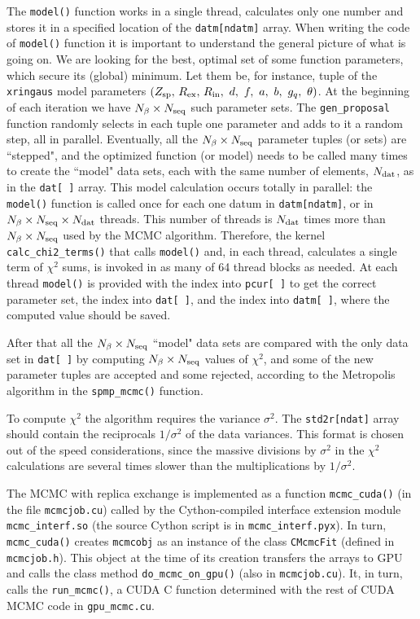 \documentclass[preprint2]{aastex}
\newcommand{\rex}{\, R_\mathrm{ex}}
\newcommand{\rin}{\, R_\mathrm{in}}
\begin{document}
The \verb|model()| function works in a single thread, calculates only one 
number and stores it in a specified location of the \verb|datm[ndatm]| array. 
When writing the code of \verb|model()| function it is important to understand
the general picture of what is going on. We are looking 
for the best, optimal set of some function parameters, which secure its (global)
minimum. Let them be, for instance, tuple of the \verb|xringaus| model parameters
$(Z_{\rm sp}, \rex, \rin, \ d, \ f, \ a, \ b, \ g_q, \ \theta)$.   
At the beginning of each iteration we have $N_\beta \times N_{\rm seq}$ such 
parameter sets. The \verb|gen_proposal| function randomly selects in each tuple
one parameter and adds to it a random step, all in parallel. Eventually, all 
the $N_\beta \times N_{\rm seq}$ parameter tuples (or sets) are ``stepped", and 
the optimized function (or model) needs to be called many times to create the
``model" data sets, each with the same number of elements, $N_{\rm dat}$, as 
in the \verb|dat[ ]| array. This model calculation occurs totally in parallel:
the \verb|model()| function is called once for each one datum in \verb|datm[ndatm]|,
or in $N_\beta \times N_{\rm seq} \times N_{\rm dat}$ threads. This number of
threads is $N_{\rm dat}$ times more than $N_\beta \times N_{\rm seq} $ used by 
the MCMC algorithm. Therefore, the kernel \verb|calc_chi2_terms()| that calls 
\verb|model()| and, in each thread, calculates a single term of $\chi^2$ sums,
is invoked in as many of 64 thread blocks as needed. At each thread
\verb|model()| is provided with the index into \verb|pcur[ ]| to get the correct
parameter set, the index into \verb|dat[ ]|, and the index into \verb|datm[ ]|, 
where the computed value should be saved.

After that all the $N_\beta \times N_{\rm seq}$ ``model" data sets are
compared with the only data set in \verb|dat[ ]| by computing 
$N_\beta \times N_{\rm seq}$ values of $\chi^2$, and some of the
new parameter tuples are accepted and some rejected, according to the 
Metropolis algorithm in the \verb|spmp_mcmc()| function. 

To compute $\chi^2$ the algorithm requires the variance ${\sigma^2}$.
The \verb|std2r[ndat]| array should contain the reciprocals $1/\sigma^2$ 
of the data variances. This format is chosen out of the speed considerations,
since the massive divisions by $\sigma^2$ in the $\chi^2$ calculations are 
several times slower than the multiplications by $1/\sigma^2$. 

The MCMC with replica exchange is implemented as a function \verb|mcmc_cuda()|
(in the file \verb|mcmcjob.cu|) called by the Cython-compiled interface extension 
module \verb|mcmc_interf.so| (the source Cython script is in \verb|mcmc_interf.pyx|).
In turn, \verb|mcmc_cuda()| creates \verb|mcmcobj| as an instance of the class 
\verb|CMcmcFit| (defined in \verb|mcmcjob.h|). This object at the time of its creation
transfers the arrays to GPU and calls the class method \verb|do_mcmc_on_gpu()|
(also in \verb|mcmcjob.cu|). It, in turn, calls the \verb|run_mcmc()|, a CUDA C 
function determined with the rest of CUDA MCMC code in \verb|gpu_mcmc.cu|. 
\end{document}
